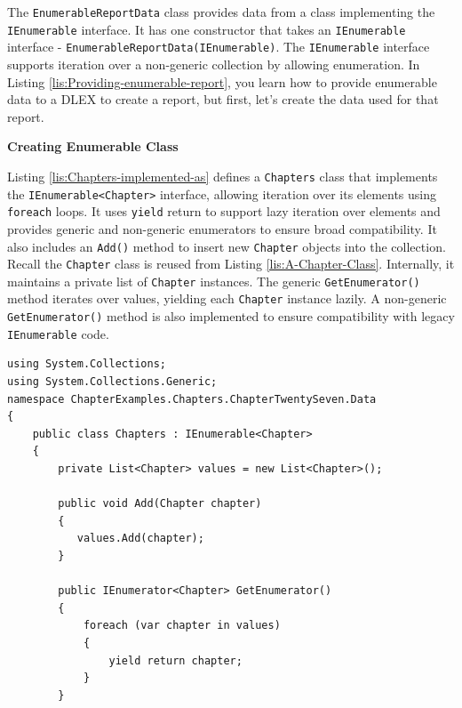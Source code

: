 \documentclass[american]{tufte-book}
\numberwithin{equation}{section}
\numberwithin{figure}{section}
\begin{document}
{{The \texttt{EnumerableReportData} class provides data from a class
implementing the \texttt{IEnumerable} interface. It has one constructor
that takes an \texttt{IEnumerable} interface - \texttt{EnumerableReportData(IEnumerable)}.
The \texttt{IEnumerable} interface supports iteration over a non-generic
collection by allowing enumeration. In Listing \ref{lis:Providing-enumerable-report},
you learn how to provide enumerable data to a DLEX to create a report,
but first, let's create the data used for that report.
\noindent\begin{flushleft}
\textbf{Creating Enumerable Class}
\par\end{flushleft}

Listing \ref{lis:Chapters-implemented-as} defines a \texttt{Chapters}
class that implements the \texttt{IEnumerable<Chapter>} interface,
allowing iteration over its elements using \texttt{foreach} loops.
It uses \texttt{yield} return to support lazy iteration over elements
and provides generic and non-generic enumerators to ensure broad compatibility.
It also includes an \texttt{Add()} method to insert new \texttt{Chapter}
objects into the collection. Recall the \texttt{Chapter} class is
reused from Listing \ref{lis:A-Chapter-Class}. Internally, it maintains
a private list of \texttt{Chapter} instances. The generic \texttt{GetEnumerator()}
method iterates over values, yielding each \texttt{Chapter} instance
lazily. A non-generic \texttt{GetEnumerator()} method is also implemented
to ensure compatibility with legacy \texttt{IEnumerable} code.

\bgroup{}
\begin{lstlisting}[caption={Chapters implemented as an enumerable object.},label={lis:Chapters-implemented-as},basicstyle={\footnotesize\ttfamily},breaklines=true]
using System.Collections;
using System.Collections.Generic;
namespace ChapterExamples.Chapters.ChapterTwentySeven.Data
{
    public class Chapters : IEnumerable<Chapter>
    {
        private List<Chapter> values = new List<Chapter>();

        public void Add(Chapter chapter)
        {
           values.Add(chapter);
        }

        public IEnumerator<Chapter> GetEnumerator()
        {
            foreach (var chapter in values)
            {
                yield return chapter;
            }
        }


\end{lstlisting}}}
\end{document}
